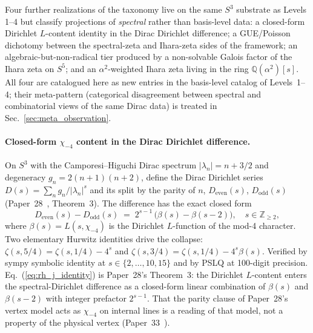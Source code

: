 \documentclass[aps,pra,twocolumn,superscriptaddress,longbibliography]{revtex4-2}
\begin{document}
Four further realizations of the taxonomy live on the same $S^3$
substrate as Levels 1--4 but classify projections of \emph{spectral}
rather than basis-level data: a closed-form Dirichlet $L$-content
identity in the Dirac Dirichlet difference; a GUE/Poisson dichotomy
between the spectral-zeta and Ihara-zeta sides of the framework; an
algebraic-but-non-radical tier produced by a non-solvable Galois
factor of the Ihara zeta on $S^5$; and an $\alpha^2$-weighted Ihara
zeta living in the ring $\mathbb{Q}(\alpha^2)[s]$.  All four are
catalogued here as new entries in the basis-level catalog of
Levels~1--4; their meta-pattern (categorical disagreement between
spectral and combinatorial views of the same Dirac data) is treated
in Sec.~\ref{sec:meta_observation}.

\paragraph{Closed-form $\chi_{-4}$ content in the Dirac Dirichlet
difference.}  On $S^3$ with the Camporesi--Higuchi Dirac
spectrum $|\lambda_n| = n + 3/2$ and degeneracy $g_n = 2(n+1)(n+2)$,
define the Dirac Dirichlet series $D(s) = \sum_n g_n / |\lambda_n|^s$
and its split by the parity of $n$, $D_{\mathrm{even}}(s)$, $D_{\mathrm{odd}}(s)$
(Paper~28~\cite{loutey_paper28}, Theorem~3). The difference has
the exact closed form
\begin{equation}
  D_{\mathrm{even}}(s) - D_{\mathrm{odd}}(s) \;=\; 2^{s-1}\,\bigl(
    \beta(s) - \beta(s-2)\bigr), \quad s \in \mathbb{Z}_{\ge 2},
  \label{eq:rh_j_identity}
\end{equation}
where $\beta(s) = L(s, \chi_{-4})$ is the Dirichlet $L$-function of
the mod-4 character. Two elementary Hurwitz identities drive the
collapse:
$\zeta(s, 5/4) = \zeta(s, 1/4) - 4^s$ and
$\zeta(s, 3/4) = \zeta(s, 1/4) - 4^s \beta(s)$.
Verified by sympy symbolic identity at $s \in \{2, \ldots, 10, 15\}$
and by PSLQ at 100-digit precision.
Eq.~(\ref{eq:rh_j_identity}) is Paper~28's Theorem~3:
the Dirichlet $L$-content enters the spectral-Dirichlet difference
as a closed-form linear combination of $\beta(s)$ and $\beta(s-2)$
with integer prefactor $2^{s-1}$.  That the parity clause of
Paper~28's vertex model acts as $\chi_{-4}$ on internal lines is a
reading of that model, not a property of the physical vertex
(Paper~33~\cite{loutey_paper33}).
\end{document}
